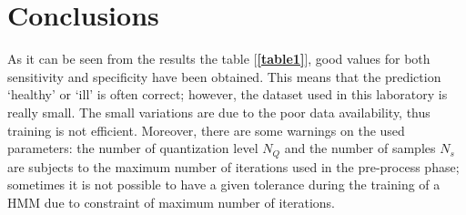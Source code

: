\documentclass[a4paper,12pt,oneside,titlepage]{article}
\begin{document}
	\section{Conclusions}
	 As it can be seen from the results the table [{\textbf{\ref{table1}}}], 
	 good values for both sensitivity and specificity have been obtained. This means that the prediction ‘healthy’ or ‘ill’ is often correct; however, the dataset used in this laboratory is really small.
	 The small variations are due to the poor data availability, thus training is not efficient. Moreover, there are some warnings on the used parameters: the number of quantization level $N_{Q}$ and the number of samples $N_{s}$ are subjects to the maximum number of iterations used in the pre-process phase; sometimes it is not possible to have a given tolerance during the training of a HMM due to constraint of maximum number of iterations.
	
	
	
\end{document}
